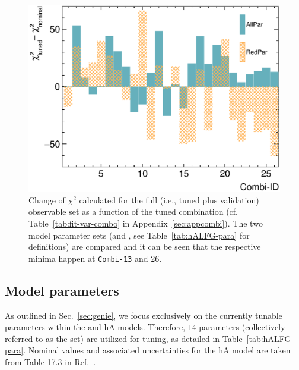 \begin{figure}[!htb] 
    \centering 		
    \includegraphics[width=\sgfigwid\textwidth]{figures/tuning/chi2_hist_covfix.eps} 
    \caption{\label{fig:allchi} Change of $\chi^2$ calculated for the full (i.e., tuned plus validation) observable set as a function of the tuned combination (cf. Table~\ref{tab:fit-var-combo} in Appendix~\ref{sec:appcombi}). The two model parameter sets (\allpar and \redpar, see Table~\ref{tab:hALFG-para} for definitions) are compared and it can be seen that the respective minima happen at \texttt{Combi-13} and 26. }   
\end{figure}

\subsection{\label{sec:tuning-para-choice} Model parameters}
As outlined in Sec.~\ref{sec:genie}, we focus exclusively on the currently tunable parameters within the \sfcfg and hA models. 
Therefore, $14$ parameters (collectively referred to as the \allpar set) are utilized for tuning, as detailed in Table~\ref{tab:hALFG-para}. 
Nominal values and associated uncertainties for the hA model are taken from Table 17.3 in Ref.~\cite{Andreopoulos:2015wxa}. 

